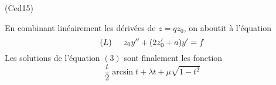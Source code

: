 \begin{tiny}(Ced15)\end{tiny} En combinant linéairement les dérivées de $z=qz_0$, on aboutit à l'équation
\begin{displaymath}
 (L)\hspace{0.5cm} z_0y'' + (2z_0'+a)y' = f
\end{displaymath}
Les solutions de l'équation $(3)$ sont finalement les fonction
\begin{displaymath}
 \frac{t}{2}\arcsin t + \lambda t + \mu \sqrt{1-t^2}
\end{displaymath}
 